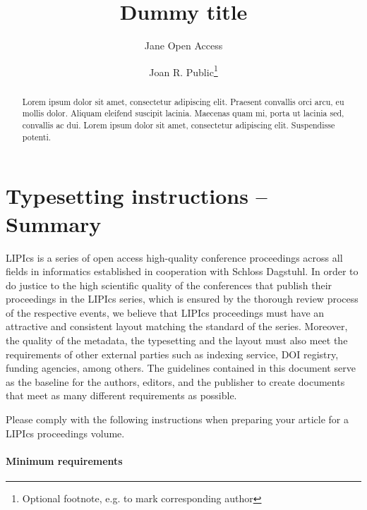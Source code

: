 \documentclass[a4paper,UKenglish,cleveref, autoref, thm-restate]{lipics-v2021}
\title{Dummy title}
\author{Jane {Open Access}}{Dummy University Computing Laboratory, [optional: Address], Country \and My second affiliation, Country \and \url{http://www.myhomepage.edu} }{johnqpublic@dummyuni.org}{https://orcid.org/0000-0002-1825-0097}{(Optional) author-specific funding acknowledgements}%
\author{Joan R. Public\footnote{Optional footnote, e.g. to mark corresponding author}}
{Department of Informatics, Dummy College, [optional: Address], Country}
{joanrpublic@dummycollege.org}
{[orcid]}
{[funding]}
\begin{document}
\maketitle

\begin{abstract}
Lorem ipsum dolor sit amet, consectetur adipiscing elit. Praesent convallis orci arcu, eu mollis dolor. Aliquam eleifend suscipit lacinia. Maecenas quam mi, porta ut lacinia sed, convallis ac dui. Lorem ipsum dolor sit amet, consectetur adipiscing elit. Suspendisse potenti.
\end{abstract}

\section{Typesetting instructions -- Summary}
\label{sec:typesetting-summary}

LIPIcs is a series of open access high-quality conference proceedings across all fields in informatics established in cooperation with Schloss Dagstuhl.
In order to do justice to the high scientific quality of the conferences that publish their proceedings in the LIPIcs series, which is ensured by the thorough review process of the respective events, we believe that LIPIcs proceedings must have an attractive and consistent layout matching the standard of the series.
Moreover, the quality of the metadata, the typesetting and the layout must also meet the requirements of other external parties such as indexing service, DOI registry, funding agencies, among others. The guidelines contained in this document serve as the baseline for the authors, editors, and the publisher to create documents that meet as many different requirements as possible.

Please comply with the following instructions when preparing your article for a LIPIcs proceedings volume.
\paragraph*{Minimum requirements}
\end{document}
